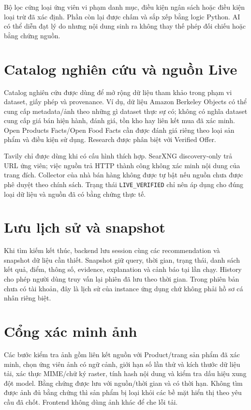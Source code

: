 Bộ lọc cứng loại ứng viên vi phạm danh mục, điều kiện ngân sách hoặc điều kiện loại trừ đã xác định. Phần còn lại được chấm và sắp xếp bằng logic Python. AI có thể diễn đạt lý do nhưng nội dung sinh ra không thay thế phép đối chiếu hoặc bằng chứng nguồn.

\section{Catalog nghiên cứu và nguồn Live}

Catalog nghiên cứu được dùng để mở rộng dữ liệu tham khảo trong phạm vi dataset, giấy phép và provenance. Ví dụ, dữ liệu Amazon Berkeley Objects có thể cung cấp metadata/ảnh theo những gì dataset thực sự có; không có nghĩa dataset cung cấp giá bán hiện hành, đánh giá, tồn kho hay liên kết mua đã xác minh. Open Products Facts/Open Food Facts cần được đánh giá riêng theo loại sản phẩm và điều kiện sử dụng. Research được phân biệt với Verified Offer.

Tavily chỉ được dùng khi có cấu hình thích hợp. SearXNG discovery-only trả URL ứng viên; việc nguồn trả HTTP thành công không xác minh nội dung của trang đích. Collector của nhà bán hàng không được tự bật nếu nguồn chưa được phê duyệt theo chính sách. Trạng thái \texttt{LIVE\_VERIFIED} chỉ nên áp dụng cho đúng loại dữ liệu và nguồn đã có bằng chứng thực tế.

\section{Lưu lịch sử và snapshot}

Khi tìm kiếm kết thúc, backend lưu session cùng các recommendation và snapshot dữ liệu cần thiết. Snapshot giữ query, thời gian, trạng thái, danh sách kết quả, điểm, thông số, evidence, explanation và cảnh báo tại lần chạy. History cho phép người dùng truy vấn lại phiên đã lưu theo thời gian. Trong phiên bản chưa có tài khoản, đây là lịch sử của instance ứng dụng chứ không phải hồ sơ cá nhân riêng biệt.

\section{Cổng xác minh ảnh}

Các bước kiểm tra ảnh gồm liên kết nguồn với Product/trang sản phẩm đã xác minh, chọn ứng viên ảnh có ngữ cảnh, giới hạn số lần thử và kích thước dữ liệu tải, xác thực MIME/chữ ký raster, tính hash nội dung và kiểm tra dấu hiệu xung đột model. Bằng chứng được lưu với nguồn/thời gian và có thời hạn. Không tìm được ảnh đủ bằng chứng thì sản phẩm bị loại khỏi các bề mặt hiển thị theo yêu cầu đã chốt. Frontend không dùng ảnh khác để che lỗi tải.

